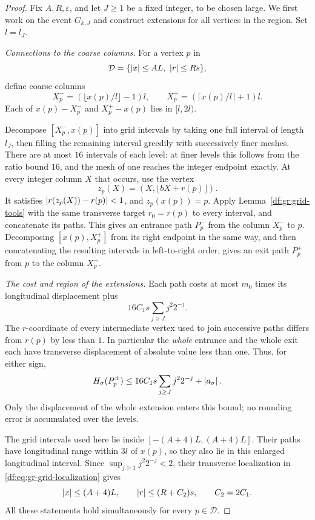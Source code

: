 \begin{proof}
Fix $A,R,\varepsilon$, and let $J\geq1$ be a fixed integer, to be chosen large.
We first work on the event $G_{k,J}$ and construct extensions for all
vertices in the region. Set $l=l_J$.

\emph{Connections to the coarse columns.}
For a vertex $p$ in
\[
 \mathcal D=\{\abs{x}\leq AL,\ \abs{r}\leq Rs\},
\]
define coarse columns
\[
 X_p^-=(\lfloor x(p)/l\rfloor-1)l,
 \qquad
 X_p^+=(\lceil x(p)/l\rceil+1)l.
\]
Each of $x(p)-X_p^-$ and $X_p^+-x(p)$ lies in $[l,2l)$.

Decompose $[X_p^-,x(p)]$ into grid intervals by taking one full interval
of length $l_J$, then filling the remaining interval greedily with
successively finer meshes. There are at most $16$ intervals of each
level: at finer levels this follows from the ratio bound $16$, and the
mesh of one reaches the integer endpoint exactly. At every integer
column $X$ that occurs, use the vertex
\[
 z_p(X)=(X,\lfloor bX+r(p)\rfloor).
\]
It satisfies $\left\lvert r(z_p(X))-r(p)\right\rvert<1$, and $z_p(x(p))=p$. Apply
Lemma~\ref{df:gr:grid-tools} with the same transverse target $r_0=r(p)$
to every interval, and concatenate its paths. This gives an entrance
path $P_p^-$ from the column $X_p^-$ to $p$. Decomposing
$[x(p),X_p^+]$ from its right endpoint in the same way, and then
concatenating the resulting intervals in left-to-right order, gives an
exit path $P_p^+$ from $p$ to the column $X_p^+$.

\emph{The cost and region of the extensions.}
Each path costs at most $m_0$ times its longitudinal displacement plus
\begin{equation}\label{df:eq:gr-extension-error}
 16C_1s\sum_{j\geq J}j^2 2^{-j}.
\end{equation}
The $r$-coordinate of every intermediate vertex used to join successive
paths differs from $r(p)$ by less than $1$. In particular the
\emph{whole} entrance and the whole exit each have transverse
displacement of absolute value less than one. Thus, for either sign,
\begin{equation}\label{df:eq:gr-extension-defect}
 H_\sigma(P_p^\pm)
 \leq16C_1s\sum_{j\geq J}j^2 2^{-j}+\left\lvert a_\sigma\right\rvert.
\end{equation}
Only the displacement of the whole extension enters this bound; no
rounding error is accumulated over the levels.

The grid intervals used here lie inside
$[-(A+4)L,(A+4)L]$. Their paths have longitudinal range within $3l$ of
$x(p)$, so they also lie in this enlarged longitudinal interval. Since
$\sup_{j\geq1}j^2 2^{-j}<2$, their transverse localization in
\eqref{df:eq:gr-grid-localization} gives
\begin{equation}\label{df:eq:gr-extension-region}
 \left\lvert x\right\rvert\leq(A+4)L,\qquad
 \left\lvert r\right\rvert\leq(R+C_2)s,
 \qquad C_2=2C_1.
\end{equation}
All these statements hold simultaneously for every $p\in\mathcal D$.


\end{proof}
